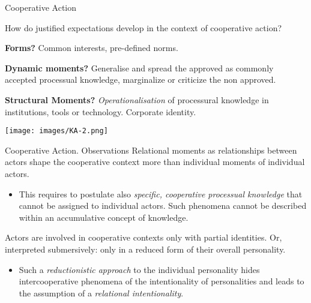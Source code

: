\documentclass{beamer}
\begin{document}
\begin{frame}{Cooperative Action}

  \begin{minipage}{.5\textwidth}\small
  How do justified expectations develop in the context of cooperative action?
  
\textbf{Forms?} Common interests, pre-defined norms.

\textbf{Dynamic moments?} Generalise and spread the approved as commonly
accepted processual knowledge, marginalize or criticize the non approved.

\textbf{Structural Moments?}  \emph{Operationa\-lisation} of processural
knowledge in institutions, tools or technology.  Corporate identity.
  \end{minipage}
\hfill
  \begin{minipage}{.47\textwidth}
  \begin{center}
    \texttt{[image: images/KA-2.png]}
  \end{center}
  
  \end{minipage}
\end{frame}

\begin{frame}{Cooperative Action. Observations}
Relational moments as relationships between actors shape the cooperative
context more than individual moments of individual actors.\vspace{-1em}
\begin{itemize}
\item This requires to postulate also \emph{specific, cooperative processual
  knowledge} that cannot be assigned to individual actors. Such phenomena
  cannot be described within an accumulative concept of knowledge.
\end{itemize}
Actors are involved in cooperative contexts only with partial identities. Or,
interpreted submersively: only in a reduced form of their overall personality.
\vspace{-1em}
\begin{itemize}
\item Such a \emph{reductionistic approach} to the individual personality
  hides intercooperative phenomena of the intentionality of personalities and
  leads to the assumption of a \emph{relational intentionality}.
\end{itemize}
\end{frame}
\end{document}
